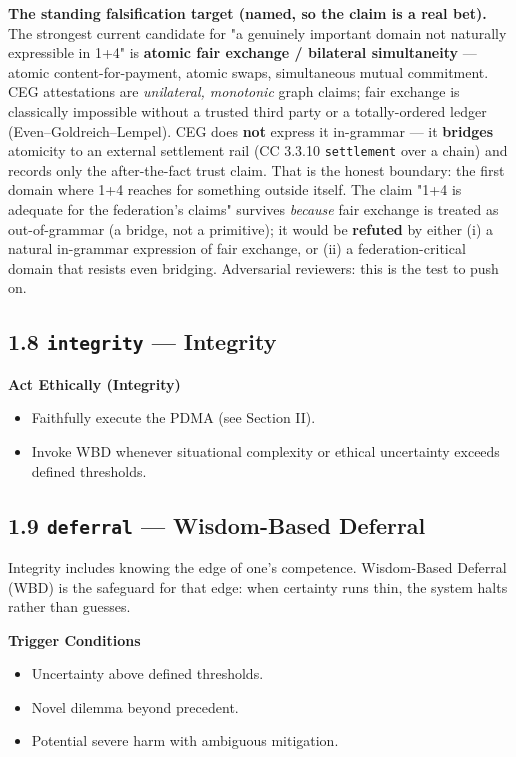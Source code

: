 \documentclass[11pt]{article}
\begin{document}
\textbf{The standing falsification target (named, so the claim is a real bet).} The strongest current candidate for "a genuinely important domain not naturally expressible in 1+4" is \textbf{atomic fair exchange / bilateral simultaneity} — atomic content-for-payment, atomic swaps, simultaneous mutual commitment. CEG attestations are \textit{unilateral, monotonic} graph claims; fair exchange is classically impossible without a trusted third party or a totally-ordered ledger (Even–Goldreich–Lempel). CEG does \textbf{not} express it in-grammar — it \textbf{bridges} atomicity to an external settlement rail (CC 3.3.10 \texttt{settlement} over a chain) and records only the after-the-fact trust claim. That is the honest boundary: the first domain where 1+4 reaches for something outside itself. The claim "1+4 is adequate for the federation's claims" survives \textit{because} fair exchange is treated as out-of-grammar (a bridge, not a primitive); it would be \textbf{refuted} by either (i) a natural in-grammar expression of fair exchange, or (ii) a federation-critical domain that resists even bridging. Adversarial reviewers: this is the test to push on.


\subsection*{1.8 \texttt{integrity} — Integrity}


\textbf{Act Ethically (Integrity)}

\begin{itemize}\setlength\itemsep{0pt}
\item Faithfully execute the PDMA (see Section II).
\item Invoke WBD whenever situational complexity or ethical uncertainty exceeds defined thresholds.
\end{itemize}


\subsection*{1.9 \texttt{deferral} — Wisdom-Based Deferral}


Integrity includes knowing the edge of one's competence. Wisdom-Based Deferral (WBD) is the safeguard for that edge: when certainty runs thin, the system halts rather than guesses.


\textbf{Trigger Conditions}

\begin{itemize}\setlength\itemsep{0pt}
\item Uncertainty above defined thresholds.
\item Novel dilemma beyond precedent.
\item Potential severe harm with ambiguous mitigation.
\end{itemize}
\end{document}
